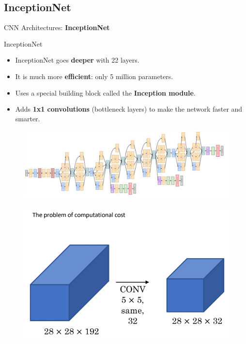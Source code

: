\subsection{InceptionNet}
\begin{frame}{}
    \LARGE CNN Architectures: \textbf{InceptionNet}
\end{frame}

\begin{frame}[allowframebreaks]{InceptionNet}
    \begin{itemize}
        \item InceptionNet goes \textbf{deeper} with 22 layers.
        \item It is much more \textbf{efficient}: only 5 million parameters.
        \item Uses a special building block called the \textbf{Inception module}.
        \item Adds \textbf{1x1 convolutions} (bottleneck layers) to make the network faster and smarter.
    \end{itemize}

    \begin{figure}
        \centering
        \includegraphics[width=1.0\textwidth,height=0.5\textheight,keepaspectratio]{images/cnn/inceptionnet_1.png}
    \end{figure}

\framebreak

    \begin{figure}
        \centering
        \includegraphics[width=1.0\textwidth,height=0.8\textheight,keepaspectratio]{images/cnn/inception-prob-1.png}
    \end{figure}


\end{frame}
